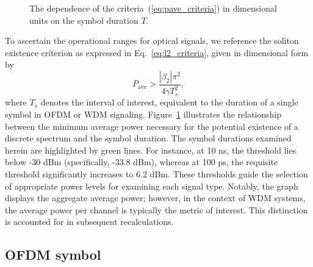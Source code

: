 \begin{figure}[htpb]
    \caption{The dependence of the criteria~(\ref{eq:pave_criteria}) in dimensional units on the symbol duration $ T $.}
    \label{fig:criteria_dim}
\end{figure}

To ascertain the operational ranges for optical signals, we reference the soliton existence criterion as expressed in Eq.~\eqref{eq:l2_criteria}, given in dimensional form by
\begin{equation}
    P_{\text{ave}} > \frac{|\beta_2| \pi^2}{4\gamma T_s^2},
    \label{eq:pave_criteria}
\end{equation}
where \( T_s \) denotes the interval of interest, equivalent to the duration of a single symbol in OFDM or WDM signaling. Figure~\ref{fig:criteria_dim} illustrates the relationship between the minimum average power necessary for the potential existence of a discrete spectrum and the symbol duration. The symbol durations examined herein are highlighted by green lines. For instance, at 10 ns, the threshold lies below -30 dBm (specifically, -33.8 dBm), whereas at 100 ps, the requisite threshold significantly increases to 6.2 dBm. These thresholds guide the selection of appropriate power levels for examining each signal type. Notably, the graph displays the aggregate average power; however, in the context of WDM systems, the average power per channel is typically the metric of interest. This distinction is accounted for in subsequent recalculations.



\subsection{OFDM symbol}

